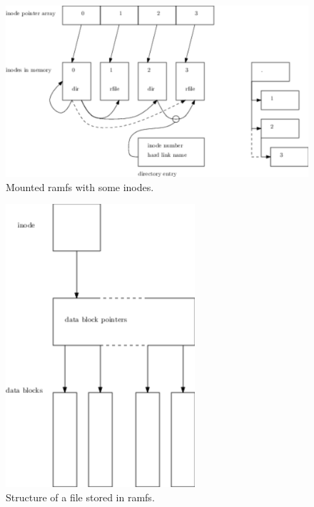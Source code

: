 \begin{figure}
  \center
  \includegraphics[width=15cm]{pics/inodes}
  \caption{Mounted ramfs with some inodes.}
  \label{figure:inodes}
\end{figure}

\begin{figure}
  \center
  \includegraphics[width=7cm]{pics/file}
  \caption{Structure of a file stored in ramfs.}
  \label{figure:file}
\end{figure}

